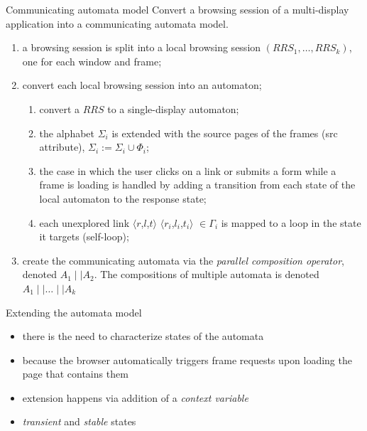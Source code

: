 \documentclass[usenames,dvipsnames]{beamer}
\newcommand{\reqmulti}[1][]{
  \ifthenelse{\equal{#1}{}} {\mbox{$\langle r$,$l$,$t\rangle$}}
  {\mbox{$\langle r_{#1}$,$l_{#1}$,$t_{#1}\rangle$}}
}
\theoremstyle{definition}
\begin{document}
\begin{frame}{Communicating automata model}
  Convert a browsing session of a multi-display application into a communicating automata model.

  \begin{enumerate}
    \item a browsing session is split into a local browsing session $(RRS_1,\dots,RRS_k)$, one for each window and frame;
    \item convert each local browsing session into an automaton;
      \begin{enumerate}
        \item convert a $RRS$ to a single-display automaton;
        \item the alphabet $\Sigma_i$ is extended with the source pages of the frames (src attribute), $\Sigma_i := \Sigma_i\cup\Phi_i$;
        \item the case in which the user clicks on a link or submits a form while a frame is loading is handled by adding a transition from each state of the local automaton to the response state;
        \item each unexplored link \reqmulti[i]$\in\Gamma_i$ is mapped to a loop in the state it targets (self-loop);
      \end{enumerate}
    \item create the communicating automata via the \textit{parallel composition operator}, denoted $A_1\mid\mid A_2$. The compositions of multiple automata is denoted $A_1\mid\mid\dots\mid\mid A_k$
  \end{enumerate}
\end{frame}

\begin{frame}{Extending the automata model}
  \begin{itemize}
    \item there is the need to characterize states of the automata
    \item because the browser automatically triggers frame requests upon loading the page that contains them
    \item extension happens via addition of a \textit{context variable}
    \item \textit{transient} and \textit{stable} states
  \end{itemize}
\end{frame}
\end{document}
